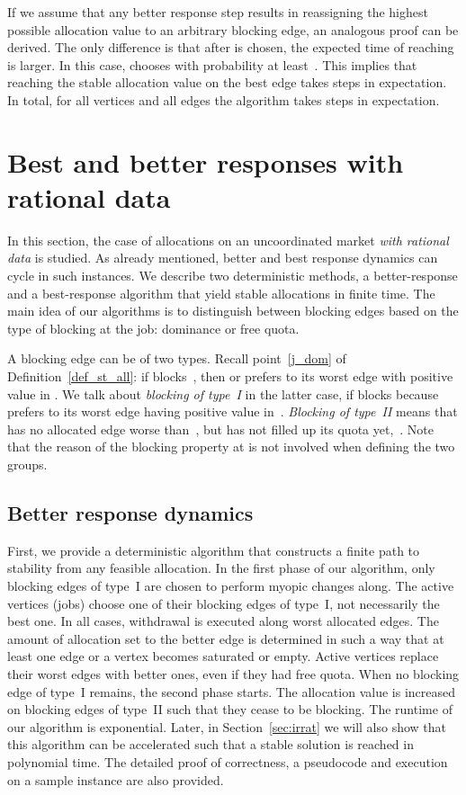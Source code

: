 \documentclass{llncs}
\begin{document}
If we assume that any better response step results in reassigning the highest possible allocation value to an arbitrary blocking edge, an analogous proof can be derived. The only difference is that after  is chosen, the expected time of reaching  is larger. In this case,  chooses  with probability at least~. This implies that reaching the stable allocation value on the best edge takes  steps in expectation. In total, for all vertices  and all edges the algorithm takes  steps in expectation.



\section{Best and better responses with rational data}
\label{sec:rat}

In this section, the case of allocations on an uncoordinated market \emph{with rational data} is studied. As already mentioned, better and best response dynamics can cycle in such instances. We describe two deterministic methods, a better-response and a best-response algorithm that yield stable allocations in finite time. The main idea of our algorithms is to distinguish between blocking edges based on the type of blocking at the job: dominance or free quota.

A blocking edge can be of two types. Recall point~\ref{j_dom} of Definition~\ref{def_st_all}: if  blocks~, then  or  prefers  to its worst edge with positive value in . We talk about \emph{blocking of type~I} in the latter case, if  blocks  because  prefers  to its worst edge having positive value in~. \emph{Blocking of type~II} means that  has no allocated edge worse than~, but  has not filled up its quota yet,~. Note that the reason of the blocking property at  is not involved when defining the two groups.

\subsection{Better response dynamics}



First, we provide a deterministic algorithm that constructs a finite path to stability from any feasible allocation. In the first phase of our algorithm, only blocking edges of type~I are chosen to perform myopic changes along. The active vertices (jobs) choose one of their blocking edges of type~I, not necessarily the best one. In all cases, withdrawal is executed along worst allocated edges. The amount of allocation set to the better edge is determined in such a way that at least one edge or a vertex becomes saturated or empty. Active vertices replace their worst edges with better ones, even if they had free quota. When no blocking edge of type~I remains, the second phase starts. The allocation value is increased on blocking edges of type~II such that they cease to be blocking. The runtime of our algorithm is exponential. Later, in Section~\ref{sec:irrat} we will also show that this algorithm can be accelerated such that a stable solution is reached in polynomial time. The detailed proof of correctness, a pseudocode and execution on a sample instance are also provided.
\end{document}
